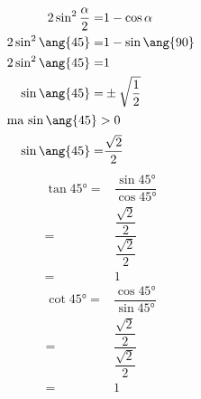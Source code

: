 \begin{align*}
	2\sin^2\dfrac{\alpha}{2}=&1-\cos\alpha\\
	2\sin^2\ang{45}=&1-\sin\ang{90}\\
	2\sin^2\ang{45}=&1\\
	\sin\ang{45}=&\pm\sqrt{\dfrac{1}{2}}\\
	\intertext{ma $\sin\ang{45}>0$}
	\sin\ang{45}=&\dfrac{\sqrt{2}}{2}\\
\end{align*}
\begin{align*}
	\tan\ang{45}=&\dfrac{\sin\ang{45}}{\cos\ang{45}}\\
	=&\dfrac{\dfrac{\sqrt{2}}{2}}{\dfrac{\sqrt{2}}{2}}\\
	=&1
\end{align*}
\begin{align*}
	\cot\ang{45}=&\dfrac{\cos\ang{45}}{\sin\ang{45}}\\
	=&\dfrac{\dfrac{\sqrt{2}}{2}}{\dfrac{\sqrt{2}}{2}}\\
	=&1
\end{align*}
